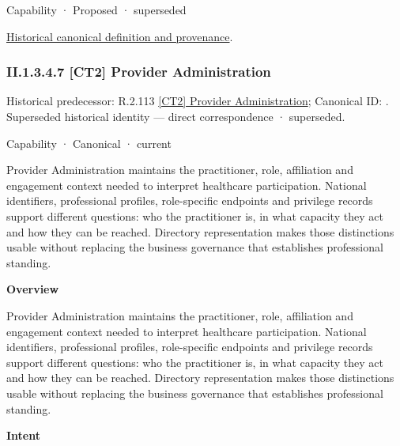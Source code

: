 \label{element:19d211cf601c49e5a65665330d0c5c3d}
{\small Capability · Proposed · superseded}\par
\href{../../../../continuum/strategy/capability/19d211cf601c49e5a65665330d0c5c3d.md}{Historical canonical definition and provenance}.\par
\subsubsection*{II.1.3.4.7 [CT2] Provider Administration}
\label{navigation:II.1.3.4.7}

{\small Historical predecessor: R.2.113 \hyperref[element:a352fd50419d451887c85fcb98566cd5]{[CT2] Provider Administration}; Canonical ID: \texttt{}. Superseded historical identity — direct correspondence · superseded.}\par
\label{element:d6312f85968a4209bafff5ed009297a6}
{\small Capability · Canonical · current}\par

Provider Administration maintains the practitioner, role, affiliation and engagement context needed to interpret healthcare participation. National identifiers, professional profiles, role-specific endpoints and privilege records support different questions: who the practitioner is, in what capacity they act and how they can be reached. Directory representation makes those distinctions usable without replacing the business governance that establishes professional standing.



\textbf{Overview}



Provider Administration maintains the practitioner, role, affiliation and engagement context needed to interpret healthcare participation. National identifiers, professional profiles, role-specific endpoints and privilege records support different questions: who the practitioner is, in what capacity they act and how they can be reached. Directory representation makes those distinctions usable without replacing the business governance that establishes professional standing.



\textbf{Intent}



